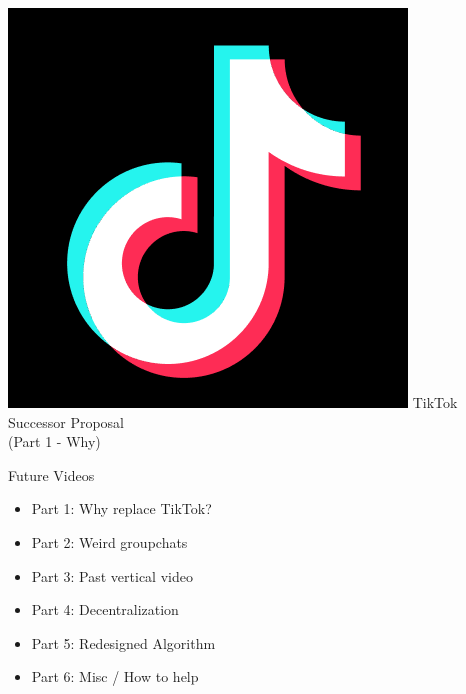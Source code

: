 \documentclass[aspectratio=12]{beamer} %
\begin{document}
\begin{frame}
\centering
\vspace{-1in}
\includegraphics[height=0.4\textheight]{imgs/app_icons/tiktok-icon2.png}
TikTok Successor Proposal \\
(Part 1 - Why)
\end{frame}

\begin{frame}{Future Videos}
\centering
\tiny
\vspace{-1.5in}
\begin{itemize}
    \item Part 1: Why replace TikTok?
    \item Part 2: Weird groupchats 
    \item Part 3: Past vertical video
    \item Part 4: Decentralization
    \item Part 5: Redesigned Algorithm
    \item Part 6: Misc / How to help
\end{itemize}
\end{frame}
\end{document}
